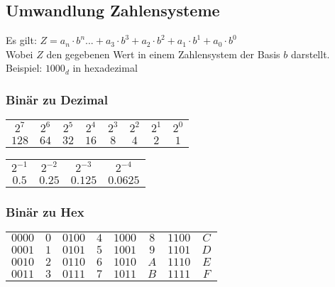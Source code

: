 \subsection{Umwandlung Zahlensysteme}
	Es gilt: $Z = a_n \cdot b^n ... + a_3 \cdot b^3 + a_2 \cdot b^2 + a_1 \cdot b^1 + a_0 \cdot b^0$ \\
	Wobei $Z$ den gegebenen Wert in einem Zahlensystem der Basis $b$ darstellt. \\
	Beispiel: $1000_d$ in hexadezimal
\subsubsection{Binär zu Dezimal}
\begin{center}
    \begin{tabular}{c|c|c|c|c|c|c|c}
        $2^7$ & $2^6$ & $2^5$ & $2^4$ & $2^3$ & $2^2$ & $2^1$ & $2^0$\\
        $128$ & $64$ & $32$ & $16$ & $8$ & $4$ & $2$ & $1$
    \end{tabular}
\end{center}
\begin{center}
    \begin{tabular}{c|c|c|c}
        $2^{-1}$ & $2^{-2}$ & $2^{-3}$ & $2^{-4}$\\
        $0.5$ & $0.25$ & $0.125$ & $0.0625$
    \end{tabular}
\end{center}

\subsubsection{Binär zu Hex}
\begin{center}
    \begin{tabular}{c c||c c||c c||c c}
        $0000$ & $0$ & $0100$ & $4$ & $1000$ & $8$ & $1100$ & $C$\\
        $0001$ & $1$ & $0101$ & $5$ & $1001$ & $9$ & $1101$ & $D$\\
        $0010$ & $2$ & $0110$ & $6$ & $1010$ & $A$ & $1110$ & $E$\\
        $0011$ & $3$ & $0111$ & $7$ & $1011$ & $B$ & $1111$ & $F$\\
    \end{tabular}
\end{center}

